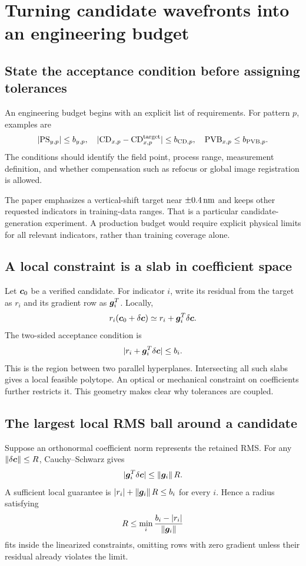 \chapter{Turning candidate wavefronts into an engineering budget}\label{ch:budget}
\section{State the acceptance condition before assigning tolerances}
An engineering budget begins with an explicit list of requirements.
For pattern $p$, examples are
\[
|\mathrm{PS}_{y,p}|\leq b_{y,p},\quad
|\mathrm{CD}_{x,p}-\mathrm{CD}_{x,p}^{\rm target}|
\leq b_{{\rm CD},p},\quad
\mathrm{PVB}_{x,p}\leq b_{{\rm PVB},p}.
\]
The conditions should identify the field point, process range,
measurement definition, and whether compensation such as refocus or
global image registration is allowed.

The paper emphasizes a vertical-shift target near $\pm0.4\,\mathrm{nm}$ and keeps
other requested indicators in training-data ranges. That is a particular
candidate-generation experiment. A production budget would require
explicit physical limits for all relevant indicators, rather than
training coverage alone.

\section{A local constraint is a slab in coefficient space}
Let $\bm{c}_0$ be a verified candidate.
For indicator $i$, write its residual from the target as $r_i$ and its
gradient row as $\bm{g}_i^T$. Locally,
\[
r_i(\bm{c}_0+\delta\bm{c})
\simeq r_i+\bm{g}_i^T\delta\bm{c}.
\]
The two-sided acceptance condition is
\begin{equation}
|r_i+\bm{g}_i^T\delta\bm{c}|\leq b_i.
\label{eq:slab}
\end{equation}
This is the region between two parallel hyperplanes.
Intersecting all such slabs gives a local feasible polytope.
An optical or mechanical constraint on coefficients further restricts it.
This geometry makes clear why tolerances are coupled.

\section{The largest local RMS ball around a candidate}
Suppose an orthonormal coefficient norm represents the retained RMS.
For any $\left\lVert\delta\bm{c}\right\rVert\leq R$, Cauchy--Schwarz gives
\[
|\bm{g}_i^T\delta\bm{c}|
\leq\left\lVert\bm{g}_i\right\rVert R.
\]
A sufficient local guarantee is
$|r_i|+\left\lVert\bm{g}_i\right\rVert R\leq b_i$ for every $i$.
Hence a radius satisfying
\begin{equation}
R\leq\min_i\frac{b_i-|r_i|}{\left\lVert\bm{g}_i\right\rVert}
\label{eq:ballbudget}
\end{equation}
fits inside the linearized constraints, omitting rows with zero gradient
unless their residual already violates the limit.

